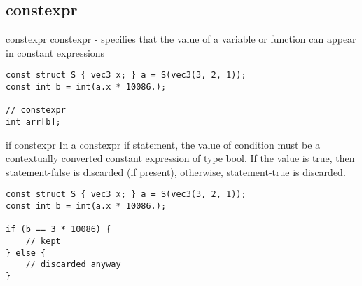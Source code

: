 \subsection{constexpr}

\begin{frame}[fragile]{constexpr}
    constexpr - specifies that the value of a variable 
    or function can appear in constant expressions

    \begin{lstlisting}
const struct S { vec3 x; } a = S(vec3(3, 2, 1));
const int b = int(a.x * 10086.);

// constexpr
int arr[b];
    \end{lstlisting}
\end{frame}

\begin{frame}[fragile]{if constexpr}
    In a constexpr if statement, the value of condition must be a contextually 
    converted constant expression of type bool. If the value is true, 
    then statement-false is discarded (if present), otherwise, statement-true is discarded.

    \begin{lstlisting}
const struct S { vec3 x; } a = S(vec3(3, 2, 1));
const int b = int(a.x * 10086.);

if (b == 3 * 10086) {
    // kept
} else {
    // discarded anyway
}
    \end{lstlisting}
\end{frame}